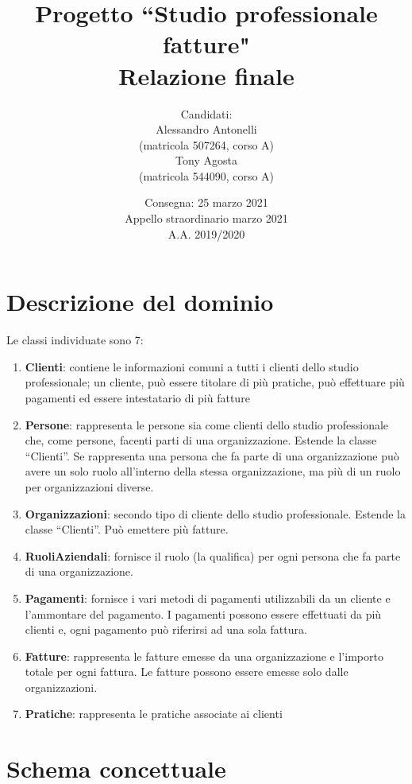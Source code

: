 \documentclass[a4paper,12pt]{article}
\title { \vspace{-1.0cm}{\small Università di Pisa\\Dipartimento di Informatica\\Corso di Laurea in Informatica\\[0.5cm]Corso di Basi di Dati (244AA), prof. Giorgio Ghelli\\[0.7cm]}Progetto ``Studio professionale fatture"\\Relazione finale }
\author { Candidati:\\Alessandro Antonelli\\(matricola 507264, corso A)\\Tony Agosta\\(matricola 544090, corso A)}
\date { Consegna: 25 marzo 2021\\Appello straordinario marzo 2021\\A.A. 2019/2020 }
\begin{document}
 \maketitle
 
 \tableofcontents

\listoffigures

\lstlistoflistings

 \clearpage
 

 \section{ Descrizione del dominio }

Le classi individuate sono  7:
\begin{enumerate}
\item \textbf{Clienti}: contiene le informazioni comuni a tutti i clienti dello studio professionale; un cliente, può essere titolare di più pratiche, può effettuare più pagamenti ed essere intestatario di più fatture
\item \textbf{Persone}: rappresenta le persone sia come clienti dello studio professionale che, come persone, facenti parti di  una organizzazione. Estende la classe “Clienti”. Se rappresenta una persona che fa parte di una organizzazione può avere un solo ruolo all’interno della stessa organizzazione, ma più di un ruolo per organizzazioni diverse.
\item \textbf{Organizzazioni}: secondo tipo di cliente dello studio professionale. Estende la classe “Clienti”. Può emettere più fatture.
\item \textbf{RuoliAziendali}: fornisce il ruolo (la qualifica) per ogni persona che fa parte di una organizzazione.
\item \textbf{Pagamenti}: fornisce i vari metodi di pagamenti utilizzabili da un cliente  e l’ammontare del pagamento. I pagamenti possono essere effettuati da più clienti e, ogni pagamento può riferirsi ad una sola fattura.
\item \textbf{Fatture}: rappresenta le fatture emesse da una organizzazione e l’importo totale per ogni fattura. Le fatture possono essere emesse solo  dalle organizzazioni.
\item \textbf{Pratiche}: rappresenta le pratiche associate ai clienti
\end{enumerate}

 \section{ Schema concettuale }
\end{document}
